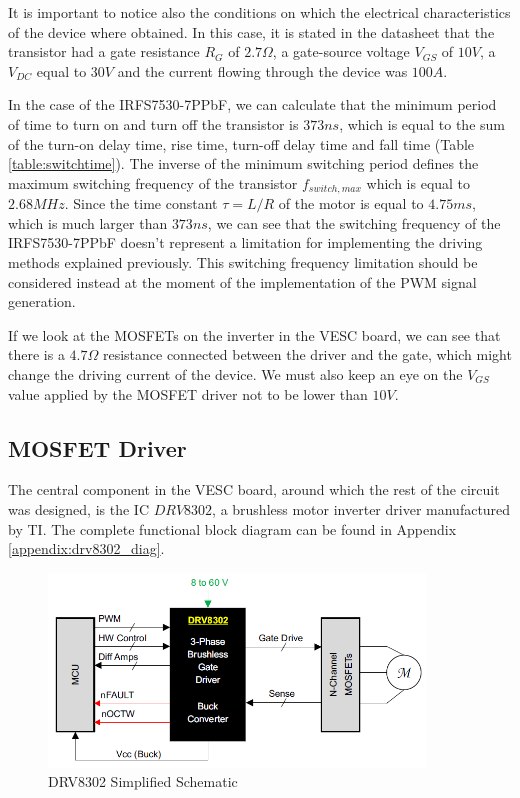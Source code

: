 It is important to notice also the conditions on which the electrical characteristics of the device where obtained. In this case, it is stated in the datasheet that the transistor had a gate resistance $R_{G}$ of $2.7\Omega$, a gate-source voltage $V_{GS}$ of $10V$, a $V_{DC}$ equal to $30V$ and the current flowing through the device was $100A$.

In the case of the IRFS7530-7PPbF, we can calculate that the minimum period of time to turn on and turn off the transistor is $373 ns$, which is equal to the sum of the turn-on delay time, rise time, turn-off delay time and fall time (Table \ref{table:switchtime}). The inverse of the minimum switching period defines the maximum switching frequency of the transistor $f_{switch,max}$ which is equal to $2.68 MHz$. Since the time constant $\tau = L/R$ of the motor is equal to $4.75 ms$, which is much larger than $373 ns$, we can see that the switching frequency of the IRFS7530-7PPbF doesn't represent a limitation for implementing the driving methods explained previously. This switching frequency limitation should be considered instead at the moment of the implementation of the \ac{PWM} signal generation.

If we look at the \ac{MOSFET}s on the inverter in the VESC board, we can see that there is a $4.7\Omega$ resistance connected between the driver and the gate, which might change the driving current of the device. We must also keep an eye on the $V_{GS}$ value applied by the \ac{MOSFET} driver not to be lower than $10V$.

\subsection{MOSFET Driver}

The central component in the VESC board, around which the rest of the circuit was designed, is the \ac{IC} $DRV8302$, a brushless motor inverter driver manufactured by \ac{TI}. The complete functional block diagram can be found in Appendix \ref{appendix:drv8302_diag}.

\begin{figure}[htbp]
\centering
\includegraphics[width=10cm]{Images/drv_simple.png} 
\caption[DRV8302 Simplified Schematic]{DRV8302 Simplified Schematic}
\label{fig:drvsimple}
\end{figure}

